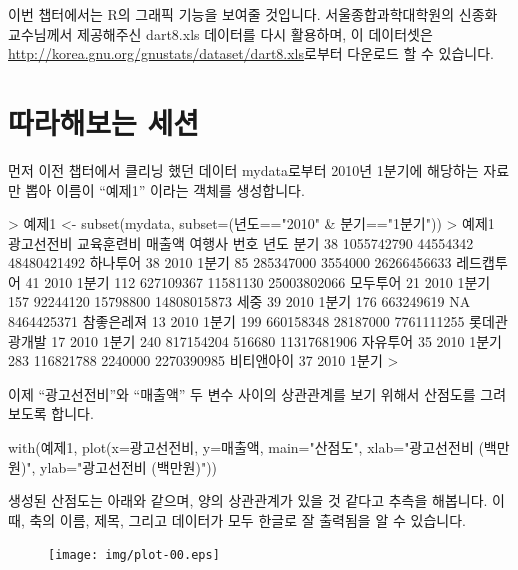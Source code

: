 이번 챕터에서는 R의 그래픽 기능을 보여줄 것입니다.
서울종합과학대학원의 신종화 교수님께서 제공해주신 dart8.xls 데이터를 다시 활용하며, 이 데이터셋은 \href{http://korea.gnu.org/gnustats/dataset/dart8.xls}{http://korea.gnu.org/gnustats/dataset/dart8.xls}로부터 다운로드 할 수 있습니다.

\section{따라해보는 세션}
먼저 이전 챕터에서 클리닝 했던 데이터 mydata로부터 2010년 1분기에 해당하는 자료만 뽑아 이름이 ``예제1'' 이라는 객체를 생성합니다.

\begin{Schunk}
\begin{Soutput}	
> 예제1 <- subset(mydata, subset=(년도=="2010" & 분기=="1분기"))
> 예제1 
    광고선전비 교육훈련비      매출액       여행사 번호 년도  분기
38  1055742790   44554342 48480421492     하나투어   38 2010 1분기
85   285347000    3554000 26266456633   레드캡투어   41 2010 1분기
112  627109367   11581130 25003802066     모두투어   21 2010 1분기
157   92244120   15798800 14808015873         세중   39 2010 1분기
176  663249619         NA  8464425371   참좋은레져   13 2010 1분기
199  660158348   28187000  7761111255 롯데관광개발   17 2010 1분기
240  817154204     516680 11317681906     자유투어   35 2010 1분기
283  116821788    2240000  2270390985   비티앤아이   37 2010 1분기
>
\end{Soutput}
\end{Schunk}

이제 ``광고선전비''와 ``매출액'' 두 변수 사이의 상관관계를 보기 위해서 산점도를 그려보도록 합니다.

\begin{Schunk}
\begin{Soutput}	
with(예제1, plot(x=광고선전비, y=매출액, main="산점도", xlab="광고선전비 (백만원)", ylab="광고선전비 (백만원)"))
\end{Soutput}
\end{Schunk}

생성된 산점도는 아래와 같으며, 양의 상관관계가 있을 것 같다고 추측을 해봅니다.
이때, 축의 이름, 제목, 그리고 데이터가 모두 한글로 잘 출력됨을 알 수 있습니다.

\begin{figure}
\begin{center}
\texttt{[image: img/plot-00.eps]}
\end{center}
\end{figure}

